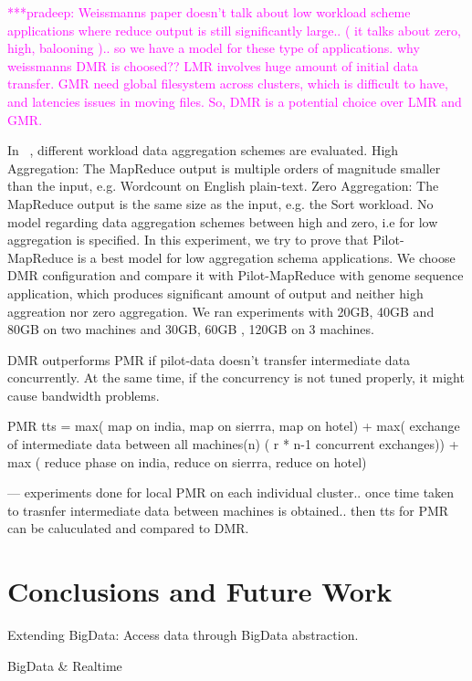\documentclass{acm_proc_article-sp}
\newcommand{\pnote}[1]{ {\textcolor{magenta} { ***pradeep: #1 }}}
\newcommand{\pnote}[1]{}
\newcommand{\pilotmapreduce}{Pilot-MapReduce\xspace}
\begin{document}
\pnote{Weissmanns paper doesn't talk about low workload scheme applications where reduce output is still significantly large.. ( it talks about zero, high, balooning ).. so we have a model for these type of applications. why weissmanns DMR is choosed?? LMR involves huge amount of initial data transfer. GMR need global filesystem across clusters, which is difficult to have, and latencies issues in moving files. So, DMR is a potential choice over LMR and GMR. }

In ~\cite{weissman-mr-11}, different workload data aggregation schemes are evaluated.  
High Aggregation: The MapReduce output is multiple orders of magnitude smaller than the input, e.g. Wordcount on English plain-text.
Zero Aggregation: The MapReduce output is the same size as the input, e.g. the Sort workload.
No model regarding data aggregation schemes between high and zero, i.e for low aggregation is specified. In this experiment, we try  to prove that \pilotmapreduce is a best model for
low aggregation schema applications. We choose ~\cite{weissman-mr-11} DMR configuration and compare it with \pilotmapreduce with genome sequence application, which produces significant amount of output and neither high aggreation nor zero aggregation. We ran experiments with 20GB, 40GB and 80GB on two machines and 30GB, 60GB , 120GB on 3 machines.






DMR outperforms PMR if pilot-data doesn't transfer intermediate data concurrently. At the same time, if the concurrency  is not tuned properly, it might cause bandwidth problems.


PMR tts = max( map  on india, map on  sierrra, map on hotel) + max( exchange of intermediate data between all machines(n) ( r * n-1 concurrent exchanges)) + max ( reduce phase on  india, reduce on  sierrra, reduce on hotel)

--- experiments done for local PMR on each individual cluster.. once time taken to trasnfer intermediate data between machines is obtained.. then tts for PMR can be caluculated and compared to DMR.




\section{Conclusions and Future Work}


Extending BigData: Access data through BigData abstraction.

BigData \& Realtime
\end{document}
